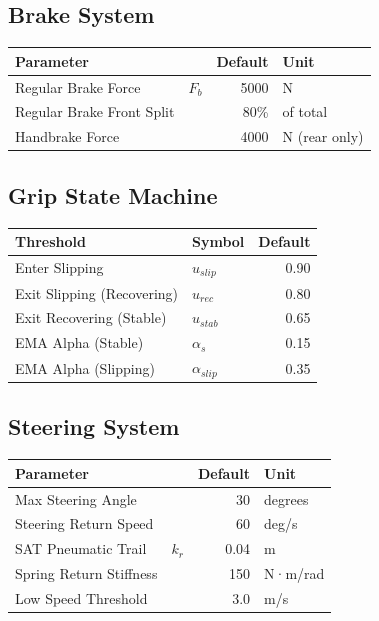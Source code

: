 \subsection{Brake System}

\begin{table}[H]
\centering
\begin{tabular}{|l|l|r|l|}
\hline
\textbf{Parameter} & & \textbf{Default} & \textbf{Unit} \\
\hline
Regular Brake Force & $F_b$ & 5000 & N \\
Regular Brake Front Split & & 80\% & of total \\
Handbrake Force & & 4000 & N (rear only) \\
\hline
\end{tabular}
\end{table}

\subsection{Grip State Machine}

\begin{table}[H]
\centering
\begin{tabular}{|l|l|r|}
\hline
\textbf{Threshold} & \textbf{Symbol} & \textbf{Default} \\
\hline
Enter Slipping & $u_{slip}$ & 0.90 \\
Exit Slipping (Recovering) & $u_{rec}$ & 0.80 \\
Exit Recovering (Stable) & $u_{stab}$ & 0.65 \\
EMA Alpha (Stable) & $\alpha_s$ & 0.15 \\
EMA Alpha (Slipping) & $\alpha_{slip}$ & 0.35 \\
\hline
\end{tabular}
\end{table}

\subsection{Steering System}

\begin{table}[H]
\centering
\begin{tabular}{|l|l|r|l|}
\hline
\textbf{Parameter} & & \textbf{Default} & \textbf{Unit} \\
\hline
Max Steering Angle & & 30 & degrees \\
Steering Return Speed & & 60 & deg/s \\
SAT Pneumatic Trail & $k_r$ & 0.04 & m \\
Spring Return Stiffness & & 150 & N·m/rad \\
Low Speed Threshold & & 3.0 & m/s \\
\hline
\end{tabular}
\end{table}

